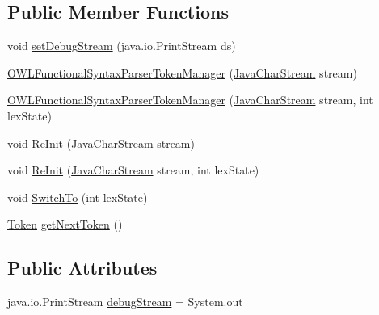 \subsection*{Public Member Functions}
\begin{DoxyCompactItemize}
\item 
void \hyperlink{classorg_1_1coode_1_1owlapi_1_1functionalparser_1_1_o_w_l_functional_syntax_parser_token_manager_a15623ca7dc3b7aec44887f3b1a48b0ae}{set\-Debug\-Stream} (java.\-io.\-Print\-Stream ds)
\item 
\hyperlink{classorg_1_1coode_1_1owlapi_1_1functionalparser_1_1_o_w_l_functional_syntax_parser_token_manager_a77042153c98766c32da29d9c24d4bb52}{O\-W\-L\-Functional\-Syntax\-Parser\-Token\-Manager} (\hyperlink{classorg_1_1coode_1_1owlapi_1_1functionalparser_1_1_java_char_stream}{Java\-Char\-Stream} stream)
\item 
\hyperlink{classorg_1_1coode_1_1owlapi_1_1functionalparser_1_1_o_w_l_functional_syntax_parser_token_manager_a8ed8b85a063b52b73b8f4d2c1490ffa4}{O\-W\-L\-Functional\-Syntax\-Parser\-Token\-Manager} (\hyperlink{classorg_1_1coode_1_1owlapi_1_1functionalparser_1_1_java_char_stream}{Java\-Char\-Stream} stream, int lex\-State)
\item 
void \hyperlink{classorg_1_1coode_1_1owlapi_1_1functionalparser_1_1_o_w_l_functional_syntax_parser_token_manager_a6e2c30a768eb1c4b7d8c17bc60d341cb}{Re\-Init} (\hyperlink{classorg_1_1coode_1_1owlapi_1_1functionalparser_1_1_java_char_stream}{Java\-Char\-Stream} stream)
\item 
void \hyperlink{classorg_1_1coode_1_1owlapi_1_1functionalparser_1_1_o_w_l_functional_syntax_parser_token_manager_af4fb26145ad1d7406749d3a0d536c613}{Re\-Init} (\hyperlink{classorg_1_1coode_1_1owlapi_1_1functionalparser_1_1_java_char_stream}{Java\-Char\-Stream} stream, int lex\-State)
\item 
void \hyperlink{classorg_1_1coode_1_1owlapi_1_1functionalparser_1_1_o_w_l_functional_syntax_parser_token_manager_aa484c72a809f4488f7309ac250d98e2e}{Switch\-To} (int lex\-State)
\item 
\hyperlink{classorg_1_1coode_1_1owlapi_1_1functionalparser_1_1_token}{Token} \hyperlink{classorg_1_1coode_1_1owlapi_1_1functionalparser_1_1_o_w_l_functional_syntax_parser_token_manager_a9d79affda5777a906dedecd195ae47f1}{get\-Next\-Token} ()
\end{DoxyCompactItemize}
\subsection*{Public Attributes}
\begin{DoxyCompactItemize}
\item 
java.\-io.\-Print\-Stream \hyperlink{classorg_1_1coode_1_1owlapi_1_1functionalparser_1_1_o_w_l_functional_syntax_parser_token_manager_a83674cdd645bf385e5feca51333c6739}{debug\-Stream} = System.\-out
\end{DoxyCompactItemize}
